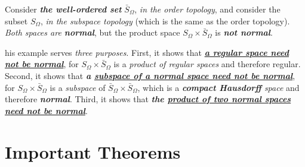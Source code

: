 \documentclass[11pt]{article}
\begin{document}
\begin{itemize}
\begin{example}
Consider \emph{\textbf{the well-ordered set}} $\bar{S}_{\Omega}$, \emph{in the order topology}, and consider the subset $S_{\Omega}$, \emph{in the subspace topology} (which is the same as the order topology). \emph{Both spaces are \textbf{normal}}, but the product space $S_{\Omega}\times \bar{S}_{\Omega}$ is \emph{\textbf{not normal}}.

his example serves \emph{three purposes}. First, it shows that \underline{\emph{\textbf{a regular space need not be normal}}}, for $S_{\Omega}\times \bar{S}_{\Omega}$ is a \emph{product of regular spaces} and therefore regular. Second, it shows that \emph{\textbf{a \underline{subspace of a normal space need not be normal}}}, for $S_{\Omega}\times \bar{S}_{\Omega}$ is a \emph{subspace} of $\bar{S}_{\Omega}\times \bar{S}_{\Omega}$, which is a \emph{\textbf{compact Hausdorff} space} and therefore \emph{\textbf{normal}}. Third, it shows that \emph{\textbf{the \underline{product of two normal spaces need not be normal}}}.
\end{example}
\end{itemize}

\section{Important Theorems}
\end{document}
